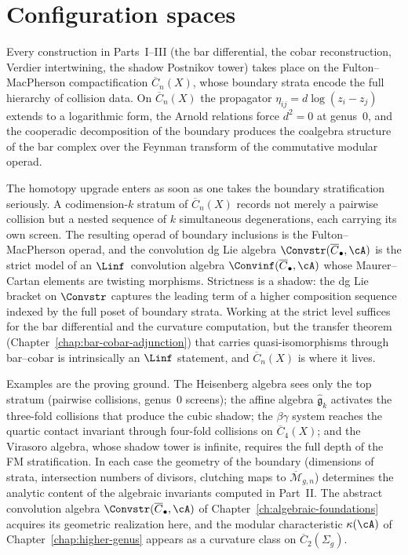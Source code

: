 \chapter{Configuration spaces}
\label{chap:config-spaces}

Every construction in Parts~I--III (the bar differential, the cobar
reconstruction, Verdier intertwining, the shadow Postnikov tower) takes
place on the Fulton--MacPherson compactification $\overline{C}_n(X)$,
whose boundary strata encode the full hierarchy of collision data.  On
$\overline{C}_n(X)$ the propagator $\eta_{ij} = d\log(z_i - z_j)$
extends to a logarithmic form, the Arnold relations force $d^2 = 0$ at
genus~$0$, and the cooperadic decomposition of the boundary produces the
coalgebra structure of the bar complex over the Feynman transform of the
commutative modular operad.

The homotopy upgrade enters as soon as one takes the boundary
stratification seriously.  A codimension-$k$ stratum of
$\overline{C}_n(X)$ records not merely a pairwise collision but a
nested sequence of $k$ simultaneous degenerations, each carrying its own
screen.  The resulting operad of boundary inclusions is the
Fulton--MacPherson operad, and the convolution dg Lie algebra
$\Convstr(\overline{C}_\bullet, \cA)$ is the strict model of an
$\Linf$~convolution algebra $\Convinf(\overline{C}_\bullet, \cA)$ whose
Maurer--Cartan elements are twisting morphisms.  Strictness is a shadow:
the dg Lie bracket on $\Convstr$ captures the leading term of a higher
composition sequence indexed by the full poset of boundary strata.
Working at the strict level suffices for the bar differential and the
curvature computation, but the transfer theorem
(Chapter~\ref{chap:bar-cobar-adjunction}) that carries quasi-isomorphisms
through bar--cobar is intrinsically an $\Linf$ statement, and
$\overline{C}_n(X)$ is where it lives.

Examples are the proving ground.  The Heisenberg algebra sees only the
top stratum (pairwise collisions, genus~$0$ screens); the affine algebra
$\widehat{\mathfrak{g}}_k$ activates the three-fold collisions that
produce the cubic shadow; the $\beta\gamma$ system reaches the quartic
contact invariant through four-fold collisions on $\overline{C}_4(X)$;
and the Virasoro algebra, whose shadow tower is infinite, requires the
full depth of the FM stratification.  In each case the geometry of the
boundary (dimensions of strata, intersection numbers of divisors,
clutching maps to $\overline{\mathcal{M}}_{g,n}$) determines the
analytic content of the algebraic invariants computed in
Part~II\@.  The abstract convolution algebra
$\Convstr(\overline{C}_\bullet, \cA)$ of
Chapter~\ref{ch:algebraic-foundations} acquires its geometric realization
here, and the modular characteristic $\kappa(\cA)$ of
Chapter~\ref{chap:higher-genus} appears as a curvature class on
$\overline{C}_2(\Sigma_g)$.

